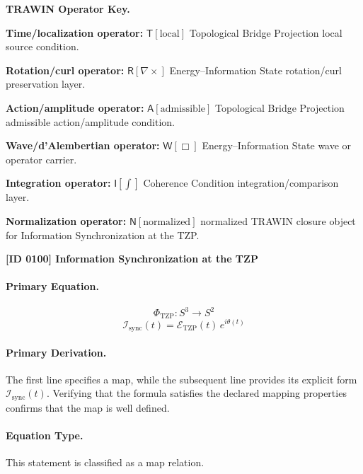 \par\vspace{0.45\baselineskip}
\noindent\begin{minipage}[t]{\linewidth}
\begingroup
\small
\raggedright
\textbf{TRAWIN Operator Key.}\par
\noindent\textbf{Time/localization operator:} $\mathsf{T}\!\left[\mathrm{local}\right]$ Topological Bridge Projection local source condition.\par
\noindent\textbf{Rotation/curl operator:} $\mathsf{R}\!\left[\nabla\times\right]$ Energy--Information State rotation/curl preservation layer.\par
\noindent\textbf{Action/amplitude operator:} $\mathsf{A}\!\left[\mathrm{admissible}\right]$ Topological Bridge Projection admissible action/amplitude condition.\par
\noindent\textbf{Wave/d'Alembertian operator:} $\mathsf{W}\!\left[\Box\right]$ Energy--Information State wave or operator carrier.\par
\noindent\textbf{Integration operator:} $\mathsf{I}\!\left[\int\right]$ Coherence Condition integration/comparison layer.\par
\noindent\textbf{Normalization operator:} $\mathsf{N}\!\left[\mathrm{normalized}\right]$ normalized TRAWIN closure object for Information Synchronization at the TZP.\par
\endgroup
\end{minipage}

\clearpage
\noindent\textbf{[ID 0100] Information Synchronization at the TZP}\par
\vspace{0.35em}
\paragraph{Primary Equation.}
\[
\Phi_{\mathrm{TZP}} : S^3 \longrightarrow S^2
\]
\[
\mathcal{I}_{\mathrm{sync}}(t)
=
\mathcal{E}_{\mathrm{TZP}}(t)\,e^{i\theta(t)}
\]

\paragraph{Primary Derivation.}
The first line specifies a map, while the subsequent line provides its explicit form \( \mathcal{I}_{\mathrm{sync}}(t) \). Verifying that the formula satisfies the declared mapping properties confirms that the map is well defined.
\paragraph{Equation Type.}
This statement is classified as a map relation.

